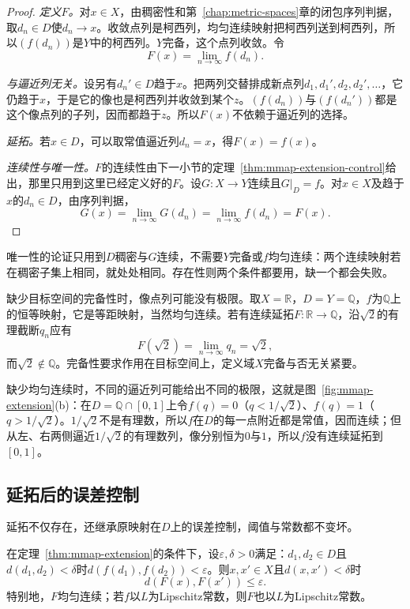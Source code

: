 \begin{proof}
\emph{定义$F$。}对$x\in X$，由稠密性和第~\ref{chap:metric-spaces}章的闭包序列判据，取$d_n\in D$使$d_n\to x$。收敛点列是柯西列，均匀连续映射把柯西列送到柯西列，所以$(f(d_n))$是$Y$中的柯西列。$Y$完备，这个点列收敛。令
\[
 F(x)=\lim_{n\to\infty}f(d_n).
\]

\emph{与逼近列无关。}设另有$d_n'\in D$趋于$x$。把两列交替排成新点列$d_1,d_1',d_2,d_2',\ldots$，它仍趋于$x$，于是它的像也是柯西列并收敛到某个$z$。$(f(d_n))$与$(f(d_n'))$都是这个像点列的子列，因而都趋于$z$。所以$F(x)$不依赖于逼近列的选择。

\emph{延拓。}若$x\in D$，可以取常值逼近列$d_n=x$，得$F(x)=f(x)$。

\emph{连续性与唯一性。}$F$的连续性由下一小节的定理~\ref{thm:mmap-extension-control}给出，那里只用到这里已经定义好的$F$。设$G:X\to Y$连续且$G|_D=f$。对$x\in X$及趋于$x$的$d_n\in D$，由序列判据，
\[
 G(x)=\lim_{n\to\infty}G(d_n)=\lim_{n\to\infty}f(d_n)=F(x).
\]
\end{proof}

唯一性的论证只用到$D$稠密与$G$连续，不需要$Y$完备或$f$均匀连续：两个连续映射若在稠密子集上相同，就处处相同。存在性则两个条件都要用，缺一个都会失败。

缺少目标空间的完备性时，像点列可能没有极限。取$X=\mathbb R$，$D=Y=\mathbb Q$，$f$为$\mathbb Q$上的恒等映射，它是等距映射，当然均匀连续。若有连续延拓$F:\mathbb R\to\mathbb Q$，沿$\sqrt2$的有理截断$q_n$应有
\[
 F(\sqrt2)=\lim_{n\to\infty}q_n=\sqrt2,
\]
而$\sqrt2\notin\mathbb Q$。完备性要求作用在目标空间上，定义域$X$完备与否无关紧要。

缺少均匀连续时，不同的逼近列可能给出不同的极限，这就是图~\ref{fig:mmap-extension}(b)：在$D=\mathbb Q\cap[0,1]$上令$f(q)=0$（$q<1/\sqrt2$）、$f(q)=1$（$q>1/\sqrt2$）。$1/\sqrt2$不是有理数，所以$f$在$D$的每一点附近都是常值，因而连续；但从左、右两侧逼近$1/\sqrt2$的有理数列，像分别恒为$0$与$1$，所以$f$没有连续延拓到$[0,1]$。

\subsection{延拓后的误差控制}
\label{sec:mmap-extension-error}

延拓不仅存在，还继承原映射在$D$上的误差控制，阈值与常数都不变坏。

\begin{theorem}[延拓保持均匀连续与Lipschitz常数]
\label{thm:mmap-extension-control}
在定理~\ref{thm:mmap-extension}的条件下，设$\varepsilon,\delta>0$满足：$d_1,d_2\in D$且$d(d_1,d_2)<\delta$时$d(f(d_1),f(d_2))<\varepsilon$。则$x,x'\in X$且$d(x,x')<\delta$时
\begin{equation}
 d(F(x),F(x'))\leq\varepsilon.
 \label{eq:mmap-extension-control}
\end{equation}
特别地，$F$均匀连续；若$f$以$L$为Lipschitz常数，则$F$也以$L$为Lipschitz常数。
\end{theorem}

